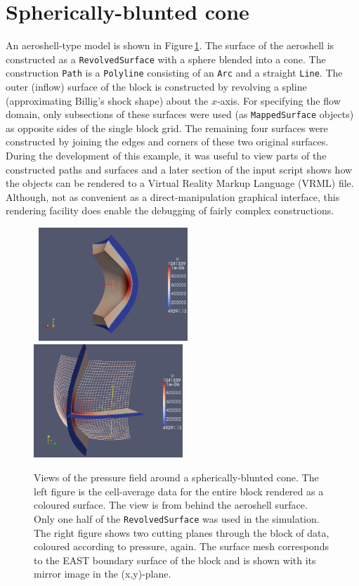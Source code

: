 \section{Spherically-blunted cone}
%
An aeroshell-type model is shown in Figure\,\ref{sphere-cone-p-fig}.
The surface of the aeroshell is constructed as a \texttt{RevolvedSurface} 
with a sphere blended into a cone.
The construction \texttt{Path} is a \texttt{Polyline} consisting of 
an \texttt{Arc} and a straight \texttt{Line}.
The outer (inflow) surface of the block is constructed by revolving a spline
(approximating Billig's shock shape) about the $x$-axis. 
For specifying the flow domain, only subsections of these surfaces were used
(as \texttt{MappedSurface} objects) as opposite sides of the single block
grid.
The remaining four surfaces were constructed by joining the edges and corners
of these two original surfaces.
During the development of this example, it was useful to view parts of the
constructed paths and surfaces and a later section of the input script shows
how the objects can be rendered to a Virtual Reality Markup Language (VRML)
file.
Although, not as convenient as a direct-manipulation graphical interface, this
rendering facility does enable the debugging of fairly complex constructions.

\begin{figure}[htbp]
\mbox{
\includegraphics[width=0.5\textwidth]{../3D/sphere-cone/sphere-cone-p-field-from-inside.png}
\includegraphics[width=0.5\textwidth]{../3D/sphere-cone/sphere-cone-p-slices-with-mesh.png}
}
\caption{Views of the pressure field around a spherically-blunted cone.
  The left figure is the cell-average data for the entire block rendered as a
  coloured surface.  The view is from behind the aeroshell surface.  Only one
  half of the \texttt{RevolvedSurface} was used in the simulation.
  The right figure shows two cutting planes through the block of data,
  coloured according to pressure, again.
  The surface mesh corresponds to the EAST boundary surface of the block
  and is shown with its mirror image in the (x,y)-plane.}
\label{sphere-cone-p-fig}
\end{figure}


